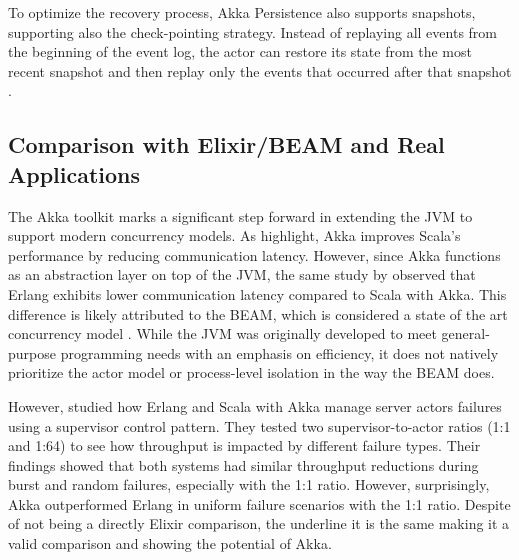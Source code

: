 To optimize the recovery process, Akka Persistence also supports snapshots, supporting also the check-pointing strategy. Instead of replaying all events from the beginning of the event log, the actor can restore its state from the most recent snapshot and then replay only the events that occurred after that snapshot \cite{Abraham2023,akka-docs}.

\subsection{Comparison with Elixir/BEAM and Real Applications}

The Akka toolkit marks a significant step forward in extending the \gls{JVM} to support modern concurrency models. As \textcite{Valkov2018} highlight, Akka improves Scala’s performance by reducing communication latency. However, since Akka functions as an abstraction layer on top of the \gls{JVM}, the same study by observed that Erlang exhibits lower communication latency compared to Scala with Akka. This difference is likely attributed to the \gls{BEAM}, which is considered a state of the art concurrency model \cite{erlang-concurrency-blog}. While the \gls{JVM} was originally developed to meet general-purpose programming needs with an emphasis on efficiency, it does not natively prioritize the actor model or process-level isolation in the way the \gls{BEAM} does.

However, \textcite{Randtoul2022} studied how Erlang and Scala with Akka manage server actors failures using a supervisor control pattern. They tested two supervisor-to-actor ratios (1:1 and 1:64) to see how throughput is impacted by different failure types. Their findings showed that both systems had similar throughput reductions during burst and random failures, especially with the 1:1 ratio. However, surprisingly, Akka outperformed Erlang in uniform failure scenarios with the 1:1 ratio. Despite of not being a directly Elixir comparison, the underline it is the same making it a valid comparison and showing the potential of Akka.

